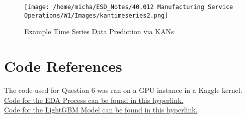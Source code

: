 \documentclass[12pt]{article}
\begin{document}
\begin{figure}[H]
    \centering
    \texttt{[image: /home/micha/ESD\_Notes/40.012 Manufacturing Service Operations/W1/Images/kantimeseries2.png]}
    \caption{Example Time Series Data Prediction via KANs}
    \label{fig:6-kanstimeseries}
\end{figure} 

\newpage

\section*{Code References}

The code used for Question 6 was ran on a GPU instance in a Kaggle kernel. \\

\noindent \href{https://www.kaggle.com/code/michaelhoon/eda-for-m5}{Code for the EDA Process can be found in this hyperlink.} \\ 

\noindent \href{https://github.com/cnicault/m5-forecasting-accuracy}{Code for the LightGBM Model can be found in this hyperlink.}




\end{document}
